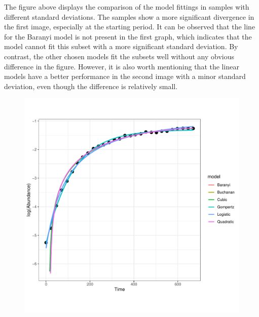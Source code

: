 \documentclass[11pt, oneside]{article}
\begin{document}
		\noindent The figure above displays the comparison of the model fittings in samples with different standard deviations. The samples show a more significant divergence in the first image, especially at the starting period. It can be observed that the line for the Baranyi model is not present in the first graph, which indicates that the model cannot fit this subset with a more significant standard deviation. By contrast, the other chosen models fit the subsets well without any obvious difference in the figure. However, it is also worth mentioning that the linear models have a better performance in the second image with a minor standard deviation, even though the difference is relatively small.
		
		\begin{figure}[H]
			\begin{center}
			\begin{minipage}{.5\textwidth}
				\centering
				\includegraphics[page=178, scale = 0.5]{plot_subsets.pdf}
			\end{minipage}%
			\begin{minipage}{.5\textwidth}
				\centering

\end{minipage}
\end{center}
\end{figure}
\end{document}
